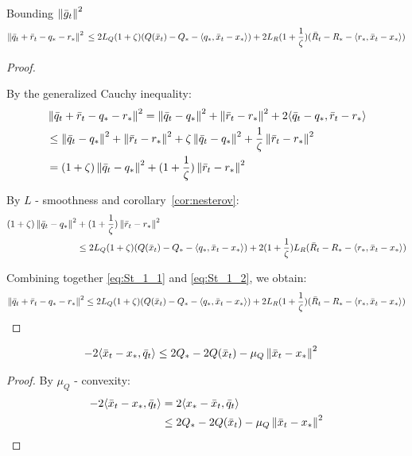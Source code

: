 \begin{lemma} \label{lem:g_t}
    Bounding $\left\|\bar{g}_t\right\|^2$
    \[  \left\|\bar{q}_t + \bar{r}_t - q_* - r_*\right\|^2 \\
        \leq
        2 L_Q(1 + \zeta)  (Q(\bar{x}_t) - Q_* - \langle q_*, \bar{x}_t - x_*\rangle)
        + 2 L_R(1 + \frac{1}{\zeta})  (\bar{R}_t - R_* - \langle r_*, \bar{x}_t - x_*\rangle)
    \]
\end{lemma}
\begin{proof}
$ $\par
    By the generalized Cauchy inequality:
    \begin{align}
        &\left\|\bar{q}_t + \bar{r}_t - q_* - r_*\right\|^2
        = \left\|\bar{q}_t - q_*\right\|^2 
        + \left\|\bar{r}_t - r_*\right\|^2
        + 2\langle \bar{q}_t - q_*, \bar{r}_t - r_*\rangle \label{eq:St_1_1} \\
        &\leq \left\|\bar{q}_t - q_*\right\|^2 
        + \left\|\bar{r}_t - r_*\right\|^2 
        + \zeta \left\|\bar{q}_t - q_*\right\|^2 
        + \frac{1}{\zeta} \left\|\bar{r}_t - r_*\right\|^2 \label{eq:St_1_2} \\
        &= (1 + \zeta)\left\|\bar{q}_t - q_*\right\|^2 + (1 + \frac{1}{\zeta})\left\|\bar{r}_t - r_*\right\|^2  \label{eq:St_1_1}
    \end{align}
    
    By $L$ - smoothness and corollary~\ref{cor:nesterov}:
    \begin{align}
        (1 + \zeta)\left\|\bar{q}_t - q_*\right\|^2 &+ (1 + \frac{1}{\zeta})\left\|\bar{r}_t - r_*\right\|^2 \\
        &\leq 2 L_Q(1 + \zeta)  (Q(\bar{x}_t) - Q_* - \langle q_*, \bar{x}_t - x_*\rangle)
        + 2(1 + \frac{1}{\zeta}) L_R (\bar{R}_t - R_* - \langle r_*, \bar{x}_t - x_*\rangle) \label{eq:St_1_2}
    \end{align}
    
    Combining together \eqref{eq:St_1_1} and \eqref{eq:St_1_2}, we obtain:
    \begin{align}
        \left\|\bar{q}_t + \bar{r}_t - q_* - r_*\right\|^2 
        \leq 2 L_Q(1 + \zeta)  (Q(\bar{x}_t) - Q_* - \langle q_*, \bar{x}_t - x_*\rangle)
        + 2 L_R(1 + \frac{1}{\zeta})  (\bar{R}_t - R_* - \langle r_*, \bar{x}_t - x_*\rangle) \label{eq:St_1}
    \end{align}
\end{proof}


\begin{lemma} \label{lem:inner_1}
    \begin{align}
        -2 \langle \bar{x}_t - x_*, \bar{q}_t\rangle &\leq 2 Q_* - 2 Q(\bar{x}_t) - \mu_Q \left\|\bar{x}_t - x_*\right\|^2 \label{eq:St_2}
    \end{align}
\end{lemma}
\begin{proof}
    By $\mu_Q$ - convexity:
    \begin{align}
        -2 \langle \bar{x}_t - x_*, \bar{q}_t\rangle &= 2 \langle x_* - \bar{x}_t, \bar{q}_t\rangle \\
        &\leq 2 Q_* - 2 Q(\bar{x}_t) - \mu_Q \left\|\bar{x}_t - x_*\right\|^2
    \end{align}
\end{proof}


